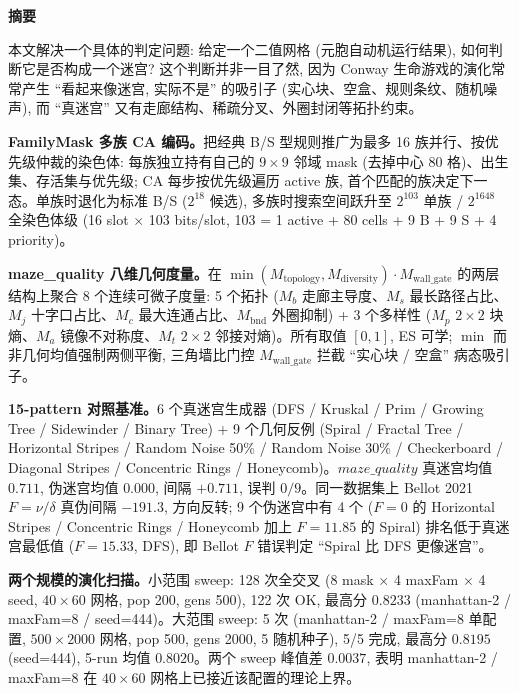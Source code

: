 
\begin{center}
{\large\bfseries\textcolor{Vermilion}{摘\quad 要}}
\end{center}

\noindent
本文解决一个具体的判定问题: 给定一个二值网格 (元胞自动机运行结果), 如何判断它是否构成一个迷宫? 这个判断并非一目了然, 因为 Conway 生命游戏的演化常常产生 ``看起来像迷宫, 实际不是'' 的吸引子 (实心块、空盒、规则条纹、随机噪声), 而 ``真迷宫'' 又有走廊结构、稀疏分叉、外圈封闭等拓扑约束。

\noindent\textbf{FamilyMask 多族 CA 编码。}把经典 B/S 型规则推广为最多 16 族并行、按优先级仲裁的染色体: 每族独立持有自己的 $9 \times 9$ 邻域 mask (去掉中心 80 格)、出生集、存活集与优先级; CA 每步按优先级遍历 active 族, 首个匹配的族决定下一态。单族时退化为标准 B/S ($2^{18}$ 候选), 多族时搜索空间跃升至 $2^{103}$ 单族 / $2^{1648}$ 全染色体级 (16 slot $\times$ 103 bits/slot, 103 = 1 active + 80 cells + 9 B + 9 S + 4 priority)。

\noindent\textbf{maze\_quality 八维几何度量。}在 $\min(M_{\text{topology}}, M_{\text{diversity}}) \cdot M_{\text{wall\_gate}}$ 的两层结构上聚合 8 个连续可微子度量: 5 个拓扑 ($M_b$ 走廊主导度、$M_s$ 最长路径占比、$M_j$ 十字口占比、$M_c$ 最大连通占比、$M_{\text{bnd}}$ 外圈抑制) + 3 个多样性 ($M_p$ $2{\times}2$ 块熵、$M_a$ 镜像不对称度、$M_t$ $2{\times}2$ 邻接对熵)。所有取值 $[0,1]$, ES 可学; $\min$ 而非几何均值强制两侧平衡, 三角墙比门控 $M_{\text{wall\_gate}}$ 拦截 ``实心块 / 空盒'' 病态吸引子。

\noindent\textbf{15-pattern 对照基准。}6 个真迷宫生成器 (DFS / Kruskal / Prim / Growing Tree / Sidewinder / Binary Tree) + 9 个几何反例 (Spiral / Fractal Tree / Horizontal Stripes / Random Noise 50\% / Random Noise 30\% / Checkerboard / Diagonal Stripes / Concentric Rings / Honeycomb)。$maze\_quality$ 真迷宫均值 $0.711$, 伪迷宫均值 $0.000$, 间隔 $+0.711$, 误判 $0/9$。同一数据集上 Bellot 2021 $F = \nu/\delta$ 真伪间隔 $-191.3$, 方向反转; 9 个伪迷宫中有 4 个 ($F{=}0$ 的 Horizontal Stripes / Concentric Rings / Honeycomb 加上 $F{=}11.85$ 的 Spiral) 排名低于真迷宫最低值 ($F{=}15.33$, DFS), 即 Bellot $F$ 错误判定 ``Spiral 比 DFS 更像迷宫''。

\noindent\textbf{两个规模的演化扫描。}小范围 sweep: 128 次全交叉 (8 mask $\times$ 4 maxFam $\times$ 4 seed, $40 \times 60$ 网格, pop 200, gens 500), 122 次 OK, 最高分 $0.8233$ (manhattan-2 / maxFam=8 / seed=444)。大范围 sweep: 5 次 (manhattan-2 / maxFam=8 单配置, $500 \times 2000$ 网格, pop 500, gens 2000, 5 随机种子), 5/5 完成, 最高分 $0.8195$ (seed=444), 5-run 均值 $0.8020$。两个 sweep 峰值差 $0.0037$, 表明 manhattan-2 / maxFam=8 在 $40 \times 60$ 网格上已接近该配置的理论上界。

